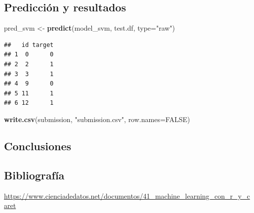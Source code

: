 \documentclass[
]{article}
\newenvironment{Shaded}{\begin{snugshade}}{\end{snugshade}}
\newcommand{\DataTypeTok}[1]{\textcolor[rgb]{0.13,0.29,0.53}{#1}}
\newcommand{\DecValTok}[1]{\textcolor[rgb]{0.00,0.00,0.81}{#1}}
\newcommand{\KeywordTok}[1]{\textcolor[rgb]{0.13,0.29,0.53}{\textbf{#1}}}
\newcommand{\NormalTok}[1]{#1}
\newcommand{\OperatorTok}[1]{\textcolor[rgb]{0.81,0.36,0.00}{\textbf{#1}}}
\newcommand{\OtherTok}[1]{\textcolor[rgb]{0.56,0.35,0.01}{#1}}
\newcommand{\StringTok}[1]{\textcolor[rgb]{0.31,0.60,0.02}{#1}}
\begin{document}
\hypertarget{predicciuxf3n-y-resultados}{%
\subsection{Predicción y resultados}\label{predicciuxf3n-y-resultados}}

\begin{Shaded}
\begin{Highlighting}[]
\NormalTok{pred_svm <-}\StringTok{ }\KeywordTok{predict}\NormalTok{(model_svm, test.df, }\DataTypeTok{type=}\StringTok{"raw"}\NormalTok{)}
\end{Highlighting}
\end{Shaded}

\begin{Shaded}
\end{Shaded}

\begin{verbatim}
##   id target
## 1  0      0
## 2  2      1
## 3  3      1
## 4  9      0
## 5 11      1
## 6 12      1
\end{verbatim}

\begin{Shaded}
\begin{Highlighting}[]
\KeywordTok{write.csv}\NormalTok{(submission, }\StringTok{"submission.csv"}\NormalTok{, }\DataTypeTok{row.names=}\OtherTok{FALSE}\NormalTok{)}
\end{Highlighting}
\end{Shaded}

\hypertarget{conclusiones}{%
\subsection{Conclusiones}\label{conclusiones}}

\hypertarget{bibliografuxeda}{%
\subsection{Bibliografía}\label{bibliografuxeda}}

\url{https://www.cienciadedatos.net/documentos/41_machine_learning_con_r_y_caret}
\end{document}
